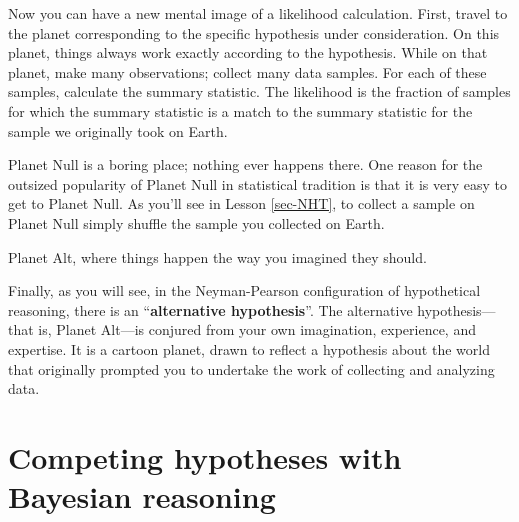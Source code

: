 \documentclass[
  letterpaper,
  DIV=11,
  numbers=noendperiod,
  oneside]{scrartcl}
\begin{document}
Now you can have a new mental image of a likelihood calculation. First,
travel to the planet corresponding to the specific hypothesis under
consideration. On this planet, things always work exactly according to
the hypothesis. While on that planet, make many observations; collect
many data samples. For each of these samples, calculate the summary
statistic. The likelihood is the fraction of samples for which the
summary statistic is a match to the summary statistic for the sample we
originally took on Earth.

Planet Null is a boring place; nothing ever happens there. One reason
for the outsized popularity of Planet Null in statistical tradition is
that it is very easy to get to Planet Null. As you'll see in Lesson
\ref{sec-NHT}, to collect a sample on Planet Null simply shuffle the
sample you collected on Earth.

\begin{marginfigure}


\caption{\label{fig-planet-earth}Planet Alt, where things happen the way
you imagined they should.}

\end{marginfigure}%

Finally, as you will see, in the Neyman-Pearson configuration of
hypothetical reasoning, there is an ``\textbf{alternative hypothesis}''.
The alternative hypothesis---that is, Planet Alt---is conjured from your
own imagination, experience, and expertise. It is a cartoon planet,
drawn to reflect a hypothesis about the world that originally prompted
you to undertake the work of collecting and analyzing data.

\newpage

\newcommand{\Ptest}{{\mathbb{P}}}
\newcommand{\Ntest}{{\mathbb{N}}}
\newcommand{\Sick}{{\cal S}}
\newcommand{\Healthy}{{\cal H}}
\newcommand{\given}{\ |\!\!|\  }

\section{Competing hypotheses with Bayesian reasoning}\label{sec-bayes}
\end{document}

